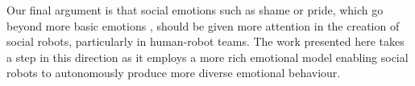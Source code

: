 Our final argument is that social emotions such as shame or pride, which go beyond more basic emotions \cite{ekman1987universals}, should be given more attention in the creation of social robots, particularly in human-robot teams. The work presented here takes a step in this direction as it employs a more rich emotional model enabling social robots to autonomously produce more diverse emotional behaviour.